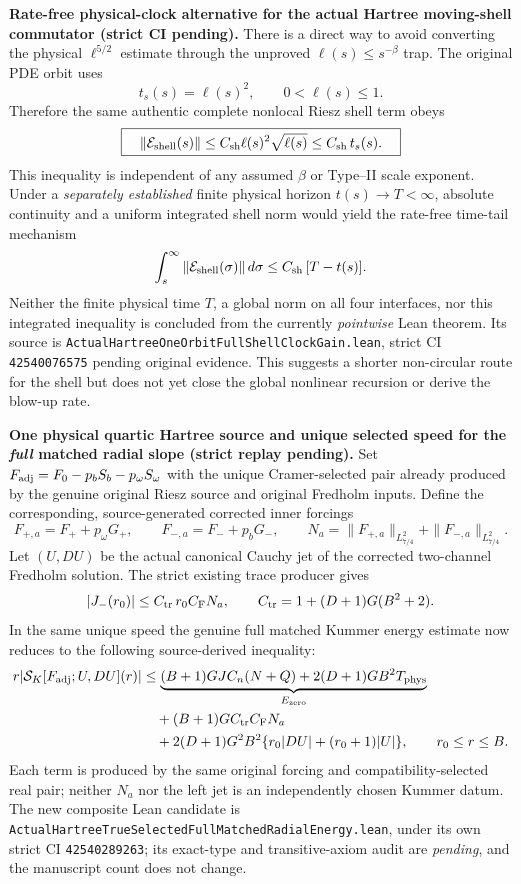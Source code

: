 \documentclass[11pt]{amsart}
\begin{document}
\medskip
\noindent\textbf{Rate-free physical-clock alternative for the actual
Hartree moving-shell commutator (strict CI pending).}
There is a direct way to avoid converting the physical
\(\ell^{5/2}\) estimate through the unproved
\(\ell(s)\le s^{-\beta}\) trap. The original PDE orbit uses
\[
 t_s(s)=\ell(s)^2,\qquad 0<\ell(s)\le1.
\]
Therefore the same authentic complete nonlocal Riesz shell term obeys
\begin{equation*}
 \boxed{\quad
 \|\mathcal E_{\rm shell}(s)\|
 \le C_{\rm sh}\ell(s)^2\sqrt{\ell(s)}
 \le C_{\rm sh}\,t_s(s).
 \quad}
\end{equation*}
This inequality is independent of any assumed \(\beta\) or
Type--II scale exponent. Under a \emph{separately established}
finite physical horizon \(t(s)\to T<\infty\), absolute
continuity and a uniform integrated shell norm would yield the
rate-free time-tail mechanism
\[
 \int_s^\infty\|\mathcal E_{\rm shell}(\sigma)\|\,d\sigma
 \le C_{\rm sh}\,[T-t(s)].
\]
Neither the finite physical time \(T\), a global norm on all
four interfaces, nor this integrated inequality is concluded from
the currently \emph{pointwise} Lean theorem. Its source is
\texttt{ActualHartreeOneOrbitFullShellClockGain.lean},
strict CI \texttt{42540076575} pending original evidence.
This suggests a shorter non-circular route for the shell but
does not yet close the global nonlinear recursion or derive
the blow-up rate.



\medskip
\noindent\textbf{One physical quartic Hartree source and unique selected
speed for the \emph{full} matched radial slope (strict replay pending).}
Set $F_{\rm adj}=F_0-p_bS_b-p_\omega S_\omega$ with the unique
Cramer-selected pair already produced by the genuine original Riesz
source and original Fredholm inputs.
Define the corresponding, source-generated corrected inner forcings
\[
 F_{+,a}=F_+ +p_\omega G_+,\qquad
 F_{-,a}=F_- +p_bG_-,\qquad
 N_a=\|F_{+,a}\|_{L^2_{7/4}}+
     \|F_{-,a}\|_{L^2_{7/4}}.
\]
Let $(U,DU)$ be the actual canonical Cauchy jet of the
corrected two-channel Fredholm solution.
The strict existing trace producer gives
\[
 |J_-(r_0)|\le C_{\rm tr}\,r_0 C_{\rm F}N_a,
 \qquad C_{\rm tr}=1+(D+1)G(B^2+2).
\]
In the same unique speed the genuine full matched Kummer energy
estimate now reduces to the following source-derived inequality:
\begin{align*}
 r|\mathcal S_K[F_{\rm adj};U,DU](r)|
 &\le \underbrace{
  (B+1)GJ C_n(N+Q)+2(D+1)GB^2T_{\rm phys}
   }_{E_{\rm zero}}\\
 &\quad+(B+1)G C_{\rm tr}C_{\rm F}N_a\\
 &\quad+2(D+1)G^2 B^2\{
      r_0|DU|+(r_0+1)|U|\},
 \qquad r_0\le r\le B.
\end{align*}
Each term is produced by the same original forcing and
compatibility-selected real pair; neither $N_a$ nor the left jet is
an independently chosen Kummer datum.
The new composite Lean candidate is
\texttt{ActualHartreeTrueSelectedFullMatchedRadialEnergy.lean},
under its own strict CI \texttt{42540289263}; its exact-type and
transitive-axiom audit are \emph{pending}, and the manuscript count
does not change.
\end{document}
